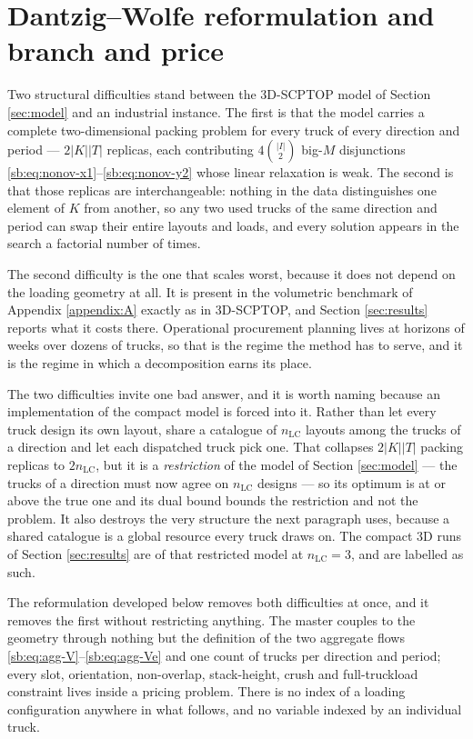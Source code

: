 \section{Dantzig--Wolfe reformulation and branch and price}
\label{sec:math}

Two structural difficulties stand between the 3D-SCPTOP model of
Section \ref{sec:model} and an industrial instance. The first is that
the model carries a complete two-dimensional packing problem for every
truck of every direction and period --- $2|K||T|$ replicas, each
contributing $4\binom{|I|}{2}$ big-$M$ disjunctions
\eqref{sb:eq:nonov-x1}--\eqref{sb:eq:nonov-y2} whose linear relaxation
is weak. The second is that those replicas are interchangeable: nothing
in the data distinguishes one element of $K$ from another, so any two
used trucks of the same direction and period can swap their entire
layouts and loads, and every solution appears in the search a factorial
number of times.

The second difficulty is the one that scales worst, because it does not
depend on the loading geometry at all. It is present in the volumetric
benchmark of Appendix \ref{appendix:A} exactly as in 3D-SCPTOP, and
Section \ref{sec:results} reports what it costs there. Operational
procurement planning lives at horizons of weeks over dozens of trucks,
so that is the regime the method has to serve, and it is the regime in
which a decomposition earns its place.

The two difficulties invite one bad answer, and it is worth naming
because an implementation of the compact model is forced into it.
Rather than let every truck design its own layout, share a catalogue of
$n_{\mathrm{LC}}$ layouts among the trucks of a direction and let each
dispatched truck pick one. That collapses $2|K||T|$ packing replicas to
$2n_{\mathrm{LC}}$, but it is a \emph{restriction} of the model of
Section \ref{sec:model} --- the trucks of a direction must now agree on
$n_{\mathrm{LC}}$ designs --- so its optimum is at or above the true one
and its dual bound bounds the restriction and not the problem. It also
destroys the very structure the next paragraph uses, because a shared
catalogue is a global resource every truck draws on. The compact 3D
runs of Section \ref{sec:results} are of that restricted model at
$n_{\mathrm{LC}}=3$, and are labelled as such.

The reformulation developed below removes both difficulties at once,
and it removes the first without restricting anything. The master
couples to the geometry through nothing but the definition of the two
aggregate flows \eqref{sb:eq:agg-V}--\eqref{sb:eq:agg-Ve} and one count
of trucks per direction and period; every slot, orientation,
non-overlap, stack-height, crush and full-truckload constraint lives
inside a pricing problem. There is no index of a loading configuration
anywhere in what follows, and no variable indexed by an individual
truck.

